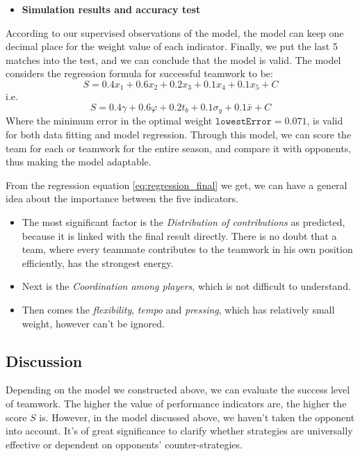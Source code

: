 \documentclass[12pt]{article}  %
\begin{document}
\vspace{4pt}
\begin{itemize}
    \item \textbf{Simulation results and accuracy test}
\end{itemize}
According to our supervised observations of the model, the model can keep one decimal place for the weight value of each indicator. Finally, we put the last 5 matches into the test, and we can conclude that the model is valid. The model considers the regression formula for successful teamwork to be:
\begin{equation}
    S = 0.4x_1 + 0.6x_2 + 0.2x_3 + 0.1x_4 + 0.1x_5 + C
\end{equation}
i.e.
\begin{equation}\label{eq:regression_final}
    S = 0.4\gamma + 0.6\varphi + 0.2t_b + 0.1\sigma_y + 0.1\bar{x} + C
\end{equation}
Where the minimum error in the optimal weight $\mathtt{lowestError} = 0.071$, is valid for both data fitting and model regression. 
Through this model, we can score the team for each or teamwork for the entire season, and compare it with opponents, thus making the model adaptable.

From the regression equation \eqref{eq:regression_final} we get, we can have a general idea about the importance between the five indicators. 
\begin{itemize}
    \setlength{\parsep}{0ex} %
    \setlength{\topsep}{2ex} %
    \setlength{\itemsep}{1ex} %
    \item The most significant factor is the \textit{Distribution of contributions} as predicted, because it is linked with the final result directly. There is no doubt that a team, where every teammate contributes to the teamwork in his own position efficiently, has the strongest energy.
    \item  Next is the \textit{Coordination among players}, which is not difficult to understand.
    \item Then comes the \textit{flexibility}, \textit{tempo} and \textit{pressing}, which has relatively small weight, however can't be ignored.
\end{itemize}



\subsection{Discussion}
Depending on the model we constructed above, we can evaluate the success level of teamwork. The higher the value of performance indicators are, the higher the score $S$ is. However, in the model discussed above, we haven't taken the opponent into account. It's of great significance to clarify whether strategies are universally effective or dependent on opponents' counter-strategies. 
\end{document}
